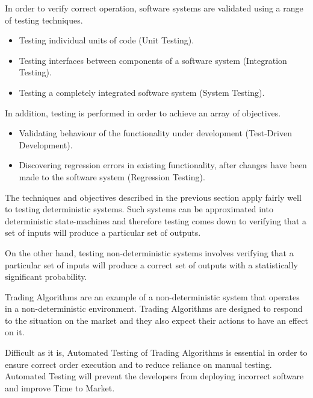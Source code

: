 In order to verify correct operation, software systems are validated using a range of testing techniques. 

\begin{itemize}
\item Testing individual units of code (Unit Testing).
\item Testing interfaces between components of a software system (Integration Testing). 
\item Testing a completely integrated software system (System Testing).
\end{itemize}

\noindent
In addition, testing is performed in order to achieve an array of objectives.
\begin{itemize}
\item Validating behaviour of the functionality under development (Test-Driven Development). 
\item Discovering regression errors in existing functionality, after changes have been made to the software system (Regression Testing).
\end{itemize}

The techniques and objectives described in the previous section apply fairly well to testing deterministic systems. Such systems can be approximated into deterministic state-machines and therefore testing comes down to verifying that a set of inputs will produce a particular set of outputs.

On the other hand, testing non-deterministic systems involves verifying that a particular set of inputs will produce a correct set of outputs with a statistically significant probability.

Trading Algorithms are an example of a non-deterministic system that operates in a non-deterministic environment. Trading Algorithms are designed to respond to the situation on the market and they also expect their actions to have an effect on it.

Difficult as it is, Automated Testing of Trading Algorithms is essential in order to ensure correct order execution and to reduce reliance on manual testing. Automated Testing will prevent the developers from deploying incorrect software and improve Time to Market.